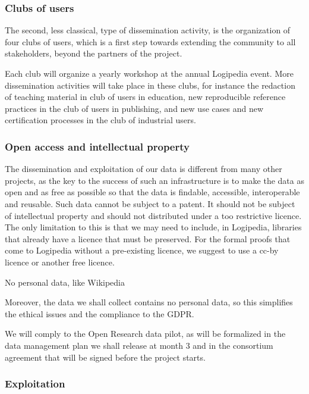 \subsubsection*{Clubs of users}

The second, less classical, type of dissemination activity, is the
organization of four clubs of users, which is a first step towards
extending the community to all stakeholders, beyond the partners of
the project.

Each club will organize a yearly workshop at the annual Logipedia
event. More dissemination activities will take place in these clubs,
for instance the redaction of teaching material in club of users in
education, new reproducible reference practices in the club of users
in publishing, and new use cases and new certification processes in the
club of industrial users.

\subsubsection*{Open access and intellectual property}

The dissemination and exploitation of our data is different from many
other projects, as the key to the success of such an infrastructure is
to make the data as open and as free as possible so that the data is
findable, accessible, interoperable and reusable. Such data cannot be
subject to a patent. It should not be subject of intellectual
property and should not distributed under a too restrictive
licence.  The only limitation to this is that we may need to include,
in Logipedia, libraries that already have a licence that must be
preserved.  For the formal proofs that come to Logipedia without a
pre-existing licence, we suggest to use a cc-by licence or another 
free licence.

{\color{red} No personal data, like Wikipedia}

Moreover, the data we shall collect contains no personal data, so this
simplifies the ethical issues and the compliance to the GDPR.

We will comply to the Open Research data pilot, as will be formalized
in the data management plan we shall release at month 3 and in the
consortium agreement that will be signed before the project starts.

\subsubsection*{Exploitation}



